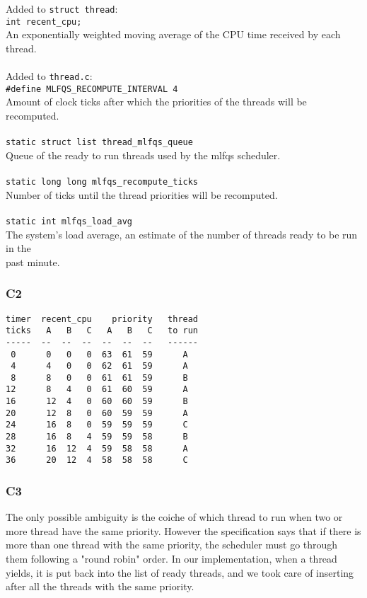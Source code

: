 \documentclass[a4wide, 11pt]{article}
\newcommand{\tab}{\hspace*{2em}}
\newcommand{\tx}{\texttt}
\begin{document}
Added to \tx{struct thread}: \\
\tab\tab \tx{int recent\_cpu;} \\
\tab\tab An exponentially weighted moving average of the CPU time received by each thread.
\\\\
Added to \tx{thread.c}: \\
\tab\tab \tx{\#define MLFQS\_RECOMPUTE\_INTERVAL 4} \\
\tab\tab Amount of clock ticks after which the priorities of the threads will be recomputed.
\\\\
\tab\tab \tx{static struct list thread\_mlfqs\_queue}\\
\tab\tab Queue of the ready to run threads used by the mlfqs scheduler.
\\\\
\tab\tab \tx{static long long mlfqs\_recompute\_ticks} \\
\tab\tab Number of ticks until the thread priorities will be recomputed.
\\\\
\tab\tab \tx{static int mlfqs\_load\_avg}\\
\tab\tab The system's load average, an estimate of the number of threads ready to be run in the \\
\tab\tab past minute.
\newpage
\subsubsection{C2}
\begin{verbatim}
timer  recent_cpu    priority   thread
ticks   A   B   C   A   B   C   to run
-----  --  --  --  --  --  --   ------
 0      0   0   0  63  61  59      A
 4      4   0   0  62  61  59      A  
 8      8   0   0  61  61  59      B
12      8   4   0  61  60  59      A
16      12  4   0  60  60  59      B
20      12  8   0  60  59  59      A     
24      16  8   0  59  59  59      C
28      16  8   4  59  59  58      B 
32      16  12  4  59  58  58      A        
36      20  12  4  58  58  58      C
\end{verbatim}

\subsubsection{C3}
The only possible ambiguity is the coiche of which thread to run when two or more thread have the same priority. However the specification says that if there is more than one thread with the same priority, the scheduler must go through them following a "round robin" order. In our implementation, when a thread yields, it is put back into the list of ready threads, and we took care of inserting after all the threads with the same priority. 
\end{document}
